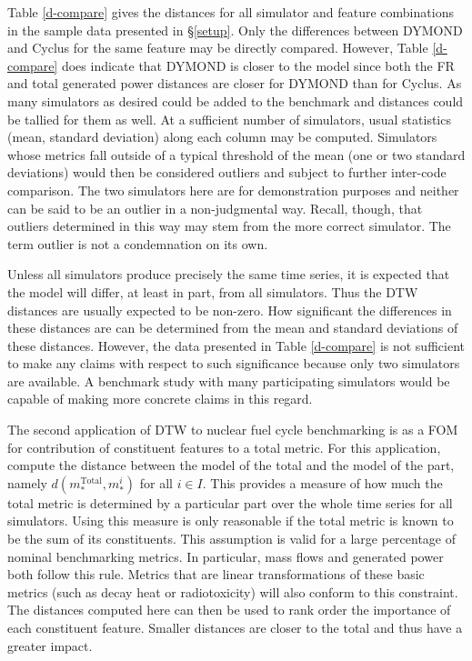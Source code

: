 \documentclass{ntmanuscript}
\newcommand{\Total}{\mathrm{Total}}
\begin{document}
Table \ref{d-compare} gives the distances for all simulator and feature
combinations in the sample data presented in \S\ref{setup}. Only the differences between DYMOND and
Cyclus for the same feature may be directly compared.  However, Table \ref{d-compare}
does indicate that DYMOND is closer to the model since both the FR and total
generated power distances are closer for DYMOND than for Cyclus.  As many
simulators as desired could be added to the benchmark and distances could
be tallied for them as well. At a sufficient number of simulators, usual
statistics (mean, standard deviation) along each column may be computed.
Simulators whose metrics fall outside of a typical threshold of the mean
(one or two standard deviations) would then be considered outliers and
subject to further inter-code comparison. The two simulators here are
for demonstration purposes and neither can be said to be an outlier in a
non-judgmental way. Recall, though, that outliers determined in this way
may stem from the more correct simulator. The term outlier is not a
condemnation on its own.

Unless all simulators produce precisely the same time series, it is
expected that the model will differ, at least in part, from all simulators.
Thus the DTW distances are usually expected to be non-zero. How significant
the differences in these distances are can be determined from the mean
and standard deviations of these distances.  However, the data presented
in Table \ref{d-compare} is not sufficient to make any claims with respect
to such significance because only two simulators are available. A benchmark
study with many participating simulators would be capable of making more
concrete claims in this regard.

The second application of DTW to nuclear fuel cycle benchmarking is as a
FOM for contribution of constituent features to a total metric. For this application,
compute the distance between the model of the total and the model of the
part, namely $d(m_*^\Total, m_*^i)$ for all $i \in I$. This provides a
measure of how much the total metric is determined by a particular part
over the whole time series for all simulators.
Using this measure is only reasonable if the total metric is known
to be the sum of its constituents.  This assumption is valid for
a large percentage of nominal benchmarking metrics. In particular,
mass flows and generated power both follow this rule. Metrics that are
linear transformations of these basic metrics (such as decay heat or
radiotoxicity) will also conform to this constraint. The distances computed here
can then be used to rank order the importance of each constituent feature.
Smaller distances are closer to the total and thus have a greater impact.
\end{document}
